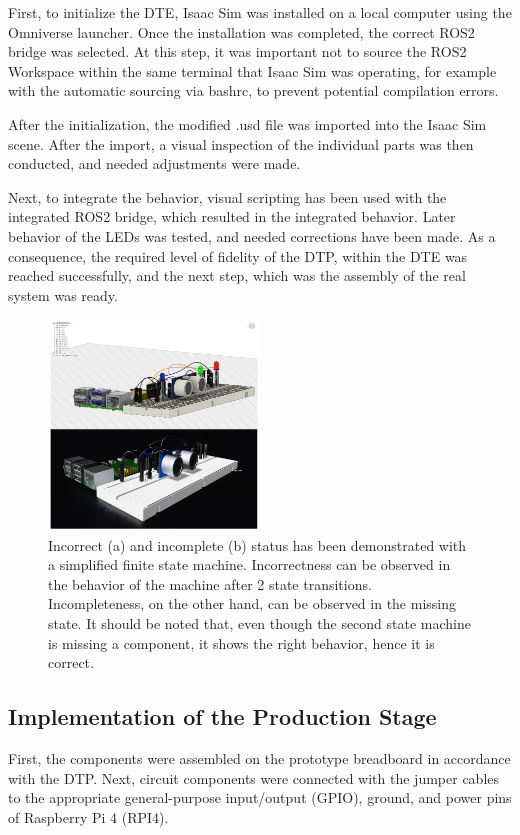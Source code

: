 \documentclass[conference]{IEEEtran}
\begin{document}
    First, to initialize the DTE, Isaac Sim was installed on a local computer using the Omniverse launcher. Once the installation was completed, the correct ROS2 bridge was selected. 
    At this step, it was important not to source the ROS2 Workspace within the same terminal that Isaac Sim was operating, for example with the automatic sourcing via bashrc, to prevent potential compilation errors. 

    After the initialization, the modified .usd file was imported into the Isaac Sim scene. After the import, a visual inspection of the individual 
    parts was then conducted, and needed adjustments were made. 

    Next, to integrate the behavior, visual scripting has been used with the integrated ROS2 bridge, which resulted in the integrated behavior. 
    Later behavior of the LEDs was tested, and needed corrections have been made. As a consequence, the required level of fidelity of the DTP, within the DTE 
    was reached successfully, and the next step, which was the assembly of the real system was ready.

    
    \begin{figure}[htbp]
        \centering
        \includegraphics[width=0.5\textwidth]{Left.png}
        \caption{Incorrect (a) and incomplete (b) status has been demonstrated with a simplified finite state machine. Incorrectness can be observed in the behavior 
        of the machine after 2 state transitions. Incompleteness, on the other hand, can be observed in the missing state. It should be noted that, even though the second state machine is missing a 
        component, it shows the right behavior, hence it is correct.}\label{fig:Left}
    \end{figure}

    \subsection{Implementation of the Production Stage}
    First, the components were assembled on the prototype breadboard in accordance with the DTP. Next, circuit components were connected with the jumper cables to the appropriate general-purpose input/output (GPIO), ground, and power pins of Raspberry Pi 4 (RPI4). 
\end{document}
